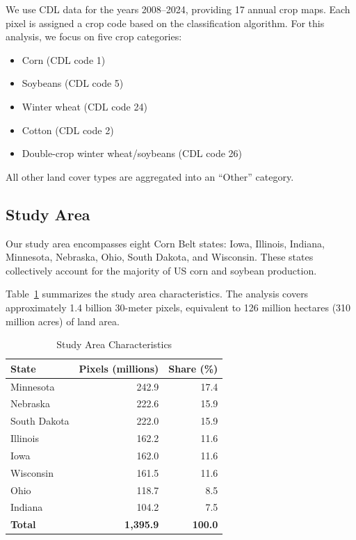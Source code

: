 \documentclass[12pt, a4paper]{article}
\begin{document}
We use CDL data for the years 2008--2024, providing 17 annual crop maps. Each pixel is assigned a crop code based on the classification algorithm. For this analysis, we focus on five crop categories:
\begin{itemize}[noitemsep]
    \item Corn (CDL code 1)
    \item Soybeans (CDL code 5)
    \item Winter wheat (CDL code 24)
    \item Cotton (CDL code 2)
    \item Double-crop winter wheat/soybeans (CDL code 26)
\end{itemize}
All other land cover types are aggregated into an ``Other'' category.

\subsection{Study Area}

Our study area encompasses eight Corn Belt states: Iowa, Illinois, Indiana, Minnesota, Nebraska, Ohio, South Dakota, and Wisconsin. These states collectively account for the majority of US corn and soybean production.

Table~\ref{tab:study_area} summarizes the study area characteristics. The analysis covers approximately 1.4 billion 30-meter pixels, equivalent to 126 million hectares (310 million acres) of land area.

\begin{table}[H]
\centering
\caption{Study Area Characteristics}
\label{tab:study_area}
\begin{tabular}{lrr}
\toprule
\textbf{State} & \textbf{Pixels (millions)} & \textbf{Share (\%)} \\
\midrule
Minnesota & 242.9 & 17.4 \\
Nebraska & 222.6 & 15.9 \\
South Dakota & 222.0 & 15.9 \\
Illinois & 162.2 & 11.6 \\
Iowa & 162.0 & 11.6 \\
Wisconsin & 161.5 & 11.6 \\
Ohio & 118.7 & 8.5 \\
Indiana & 104.2 & 7.5 \\
\midrule
\textbf{Total} & \textbf{1,395.9} & \textbf{100.0} \\
\bottomrule
\end{tabular}
\end{table}
\end{document}
